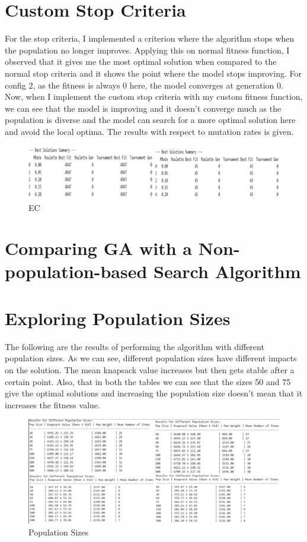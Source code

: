 \documentclass{article}
\begin{document}
\section*{Custom Stop Criteria}
	For the stop criteria, I implemented a criterion where the algorithm stops when the population no longer improves. Applying this on normal fitness function, I observed that it gives me the most optimal solution when compared to the normal stop criteria and it shows the point where the model stops improving. For config 2, as the fitness is always 0 here, the model converges at generation 0. Now, when I implement the custom stop criteria with my custom fitness function, we can see that the model is improving and it doesn’t converge much as the population is diverse and the model can search for a more optimal solution here and avoid the local optima. The results with respect to mutation rates is given.
\begin{figure}
    \centering
    \includegraphics[width=1\linewidth]{q3 ec.png}
    \caption{EC}
    \label{fig:enter-label}
\end{figure}

\section*{Comparing GA with a Non-population-based Search Algorithm}
\section*{Exploring Population Sizes}
The following are the results of performing the algorithm with different population sizes. As we can see, different population sizes have different impacts on the solution. The mean knapsack value increases but then gets stable after a certain point. Also, that in both the tables we can see that the sizes 50 and 75 give the optimal solutions and increasing the population size doesn’t mean that it increases the fitness value. 
\begin{figure}[h]
    \centering
    \includegraphics[width=1\linewidth]{q4.png}
    \caption{Population Sizes}
    \label{fig:enter-label}
\end{figure}
\end{document}
